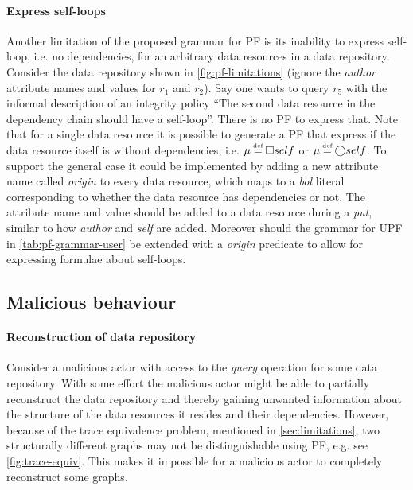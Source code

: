 \paragraph{Express self-loops} Another limitation of the proposed grammar for PF is its inability to express self-loop, i.e. no dependencies, for an arbitrary data resources in a data repository. Consider the data repository shown in \autoref{fig:pf-limitations} (ignore the \emph{author} attribute names and values for $r_1$ and $r_2$). Say one wants to query $r_5$ with the informal description of an integrity policy ``The second data resource in the dependency chain should have a self-loop''. There is no PF to express that. Note that for a single data resource it is possible to generate a PF that express if the data resource itself is without dependencies, i.e. $\inte \eqdef \G self$ or $\inte \eqdef \X self$. To support the general case it could be implemented by adding a new attribute name called \emph{origin} to every data resource, which maps to a \emph{bol} literal corresponding to whether the data resource has dependencies or not. The attribute name and value should be added to a data resource during a \emph{put}, similar to how \emph{author} and \emph{self} are added. Moreover should the grammar for UPF in \autoref{tab:pf-grammar-user} be extended with a \emph{origin} predicate to allow for expressing formulae about self-loops.

\subsection{Malicious behaviour}
\paragraph{Reconstruction of data repository}
Consider a malicious actor with access to the \emph{query} operation for some data repository. With some effort the malicious actor might be able to partially reconstruct the data repository and thereby gaining unwanted information about the structure of the data resources it resides and their dependencies. However, because of the trace equivalence problem, mentioned in \autoref{sec:limitations}, two structurally different graphs may not be distinguishable using PF, e.g. see \autoref{fig:trace-equiv}. This makes it impossible for a malicious actor to completely reconstruct some graphs.


